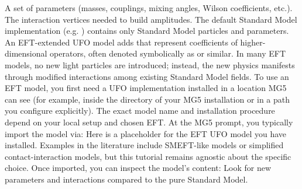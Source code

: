 \markdownRendererUlItem A set of parameters (masses, couplings, mixing angles, Wilson coefficients, etc.).\markdownRendererUlItemEnd 
\markdownRendererUlItem The interaction vertices needed to build amplitudes.\markdownRendererUlItemEnd 
\markdownRendererUlEndTight \markdownRendererInterblockSeparator
{}\markdownRendererSectionBegin
{}\markdownRendererInterblockSeparator
{}\markdownRendererUlBeginTight
\markdownRendererUlItem The default Standard Model implementation (e.g. ) contains only Standard Model particles and parameters.\markdownRendererUlItemEnd 
\markdownRendererUlItem An EFT-extended UFO model adds  that represent coefficients of higher-dimensional operators, often denoted symbolically as  or similar.\markdownRendererUlItemEnd 
\markdownRendererUlItem In many EFT models, no new light particles are introduced; instead, the new physics manifests through modified interactions among existing Standard Model fields.\markdownRendererUlItemEnd 
\markdownRendererUlEndTight \markdownRendererInterblockSeparator
{}
\markdownRendererSectionEnd \markdownRendererSectionBegin
{}\markdownRendererInterblockSeparator
{}To use an EFT model, you first need a UFO implementation installed in a location MG5 can see (for example, inside the  directory of your MG5 installation or in a path you configure explicitly). The exact model name and installation procedure depend on your local setup and chosen EFT.\markdownRendererParagraphSeparator
{}At the MG5 prompt, you typically import the model via:\markdownRendererInterblockSeparator
{}\markdownRendererInterblockSeparator
{}Here  is a placeholder for the EFT UFO model you have installed. Examples in the literature include SMEFT-like models or simplified contact-interaction models, but this tutorial remains agnostic about the specific choice.\markdownRendererParagraphSeparator
{}Once imported, you can inspect the model’s content:\markdownRendererInterblockSeparator
{}\markdownRendererInterblockSeparator
{}Look for new parameters and interactions compared to the pure Standard Model.\markdownRendererInterblockSeparator
